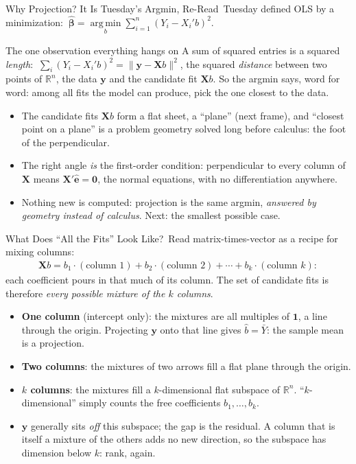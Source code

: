 \documentclass[aspectratio=169,11pt,xcolor=dvipsnames]{beamer}
\DeclareMathOperator*{\argminop}{arg\,min}
\newcommand{\argmin}{\argminop\limits}
\newcommand{\R}{\mathbb{R}}
\newcommand{\X}{\bm{X}}
\newcommand{\Y}{\bm{y}}
\newcommand{\zero}{\bm{0}}
\newcommand{\one}{\bm{1}}
\newcommand{\bhat}{\hat{\bm{\beta}}}
\newcommand{\ehat}{\hat{\bm{e}}}
\newcommand{\adv}{\,\raisebox{0.6pt}{\textcolor{accent}{$\bigstar$}}}
\begin{document}
\begin{frame}{Why Projection? It Is Tuesday's Argmin, Re-Read\adv}
Tuesday defined OLS by a minimization:
$\ \bhat = \argmin_b \sum_{i=1}^n (Y_i - X_i'b)^2$.
\begin{block}{The one observation everything hangs on}
A sum of squared entries is a squared \emph{length}:
$\ \sum_{i} (Y_i - X_i'b)^2 = \|\Y - \X b\|^2$, the squared \emph{distance}
between two points of $\R^n$, the data $\Y$ and the candidate fit $\X b$. So
the argmin says, word for word: \alert{among all fits the model can produce,
pick the one closest to the data.}
\end{block}
\begin{itemize}\itemsep2pt
  \item The candidate fits $\X b$ form a flat sheet, a ``plane'' (next
        frame), and ``closest point on a plane'' is a problem geometry solved
        long before calculus: \alert{the foot of the perpendicular}.
  \item The right angle \emph{is} the first-order condition: perpendicular to
        every column of $\X$ means $\X'\ehat = \zero$, the normal equations,
        with no differentiation anywhere.
  \item Nothing new is computed: projection is the same argmin,
        \emph{answered by geometry instead of calculus}. Next: the smallest
        possible case.
\end{itemize}
\end{frame}

\begin{frame}{What Does ``All the Fits'' Look Like?\adv}
Read matrix-times-vector as a \alert{recipe for mixing columns}:
\begin{align*}
  \X b = b_1\cdot(\text{column }1) + b_2\cdot(\text{column }2)
       + \cdots + b_k\cdot(\text{column }k) :
\end{align*}
each coefficient pours in that much of its column. The set of candidate fits
is therefore \emph{every possible mixture of the $k$ columns}.
\begin{itemize}\itemsep1pt
  \item \textbf{One column} (intercept only): the mixtures are all multiples
        of $\one$, a \alert{line} through the origin. Projecting $\Y$ onto
        that line gives $\hat b = \bar Y$: \alert{the sample mean is a
        projection}.
  \item \textbf{Two columns}: the mixtures of two arrows fill a flat
        \alert{plane} through the origin.
  \item \textbf{$k$ columns}: the mixtures fill a $k$-dimensional flat
        subspace of $\R^n$. ``$k$-dimensional'' simply counts the free
        coefficients $b_1,\dots,b_k$.
  \item $\Y$ generally sits \emph{off} this subspace; the gap is the
        residual. A column that is itself a mixture of the others adds no new
        direction, so the subspace has dimension below $k$: \alert{rank},
        again.
\end{itemize}
\end{frame}
\end{document}
